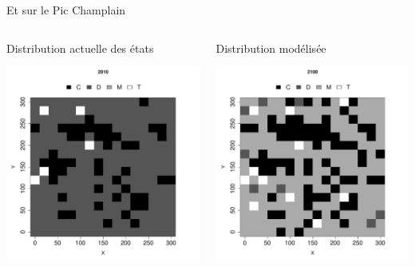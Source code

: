 \documentclass{eecslides}
\begin{document}
	\begin{frame}{Et sur le Pic Champlain}
		\begin{columns}
			\begin{column}{0.5\textwidth}
				Distribution actuelle des états
				\begin{center}
					\includegraphics[height=0.5\textheight]{BIC2010}
				\end{center}
			\end{column}
			\begin{column}{0.5\textwidth}
				Distribution modélisée
				\begin{center}
					\includegraphics[height=0.5\textheight]{BIC2100}
				\end{center}
			\end{column}
		\end{columns}	    	
	\end{frame}
\end{document}
